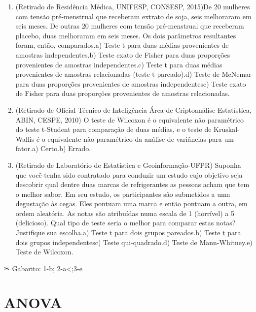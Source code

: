 \documentclass[
]{book}
\begin{document}
\begin{question}

\begin{enumerate}
\def\labelenumi{\arabic{enumi}.}
\item
  (Retirado de Residência Médica, UNIFESP, CONSESP, 2015)De 20 mulheres
  com tensão pré-menstrual que receberam extrato de soja, seis
  melhoraram em seis meses. De outras 20 mulheres com tensão
  pré-menstrual que receberam placebo, duas melhoraram em seis meses. Os
  dois parâmetros resultantes foram, então, comparados.a) Teste t para
  duas médias provenientes de amostras independentes.b) Teste exato de
  Fisher para duas proporções provenientes de amostras independentes.c)
  Teste t para duas médias provenientes de amostras relacionadas (teste
  t pareado).d) Teste de McNemar para duas proporções provenientes de
  amostras independentese) Teste exato de Fisher para duas proporções
  provenientes de amostras relacionadas.
\item
  (Retirado de Oficial Técnico de Inteligência Área de Criptoanálise
  Estatística, ABIN, CESPE, 2010) O teste de Wilcoxon é o equivalente
  não paramétrico do teste t-Student para comparação de duas médias, e o
  teste de Kruskal-Wallis é o equivalente não paramétrico da análise de
  variâncias para um fator.a) Certo.b) Errado.
\item
  (Retirado de Laboratório de Estatística e Geoinformação-UFPR) Suponha
  que você tenha sido contratado para conduzir um estudo cujo objetivo
  seja descobrir qual dentre duas marcas de refrigerantes as pessoas
  acham que tem o melhor sabor. Em seu estudo, os participantes são
  submetidos a uma degustação às cegas. Eles pontuam uma marca e então
  pontuam a outra, em ordem aleatória. As notas são atribuídas numa
  escala de 1 (horrível) a 5 (delicioso). Qual tipo de teste seria o
  melhor para comparar estas notas? Justifique sua escolha.a) Teste t
  para dois grupos pareados.b) Teste t para dois grupos independentesc)
  Teste qui-quadrado.d) Teste de Mann-Whitney.e) Teste de Wilcoxon.
\end{enumerate}

\end{question}

✂ Gabarito: 1-b; 2-a\textless;3-e

\hypertarget{anova}{%
\chapter{ANOVA}\label{anova}}
\end{document}
